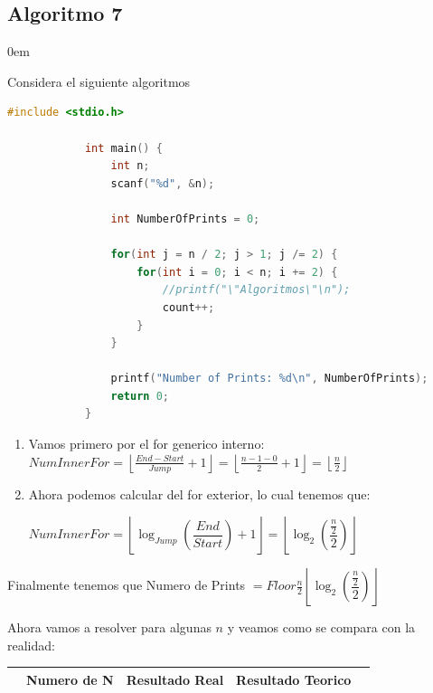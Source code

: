 \documentclass[12pt, fleqn]{article}                            %
\newenvironment{SmallIndentation}[1][0.75em]                    %
        {\begin{adjustwidth}{#1}{}\begin{footnotesize}}             %
        {\end{footnotesize}\end{adjustwidth}}                       %
\theoremstyle{break}                                            %
\newcommand{\Wrap}[1]    {\left( #1 \right)}                    %
\newcommand{\Floor}[1]{\left \lfloor #1 \right \rfloor}         %
\newcommand{\pfrac}[2]{\Wrap{\dfrac{#1}{#2}}}                   %
\begin{document}
    \subsection{Algoritmo 7}
    \begin{SmallIndentation}[0em]

        Considera el siguiente algoritmos
        \begin{lstlisting}[language=C, gobble=12, basicstyle=\small\color{white}]
            #include <stdio.h>

            int main() {
                int n;
                scanf("%d", &n);

                int NumberOfPrints = 0;
                
                for(int j = n / 2; j > 1; j /= 2) {
                    for(int i = 0; i < n; i += 2) {
                        //printf("\"Algoritmos\"\n");
                        count++;
                    }
                }

                printf("Number of Prints: %d\n", NumberOfPrints);
                return 0;
            }
        \end{lstlisting}


        \begin{enumerate}

            \item Vamos primero por el for generico interno:
                $NumInnerFor 
                    = \Floor{\frac{End - Start}{Jump} + 1}
                    = \Floor{\frac{n - 1 - 0}{2} + 1}
                    = \Floor{\frac{n}{2}}$


            \item
                Ahora podemos calcular del for exterior, lo cual tenemos que:

                $NumInnerFor 
                    = \Floor{\log_{Jump}\pfrac{End}{Start} + 1}
                    = \Floor{\log_{2}\pfrac{\frac{n}{2}}{2}}$
        \end{enumerate}

        Finalmente tenemos que Numero de Prints $ = Floor{\frac{n}{2}}\Floor{\log_{2}\pfrac{\frac{n}{2}}{2}}$
            


        Ahora vamos a resolver para algunas $n$ y veamos como se compara con
        la realidad:

        \begin{tabular}{r ||c |c | c |c }
            &  Numero de N & Resultado Real & Resultado Teorico & \\ [0.5ex] 
            \hline\hline
          

\end{tabular}
\end{SmallIndentation}
\end{document}
